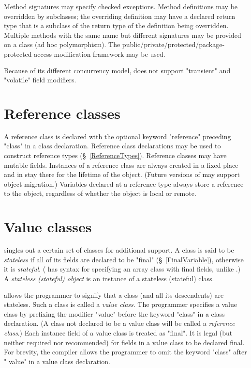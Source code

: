 Method signatures may specify checked exceptions. Method definitions
may be overridden by subclasses; the overriding definition may have a
declared return type that is a subclass of the return type of the
definition being overridden. Multiple methods with the same name but
different signatures may be provided on a class (ad hoc
polymorphism). The public/private/protected/package-protected access
modification framework may be used.


Because of its different concurrency model, \Xten{} does not support
\xcd"transient" and \xcd"volatile" field modifiers.


\section{Reference classes}\label{ReferenceClasses}
A reference class is declared with the optional keyword \xcd"reference" preceding \xcd"class" in a class declaration. Reference
class declarations may be used to construct reference types
(\S~\ref{ReferenceTypes}). Reference classes may have mutable
fields. Instances of a reference class are always created in a fixed
place and in \XtenCurrVer{} stay there for the lifetime of the
object. (Future versions of \Xten{} may support object migration.)
Variables declared at a reference type always store a reference to the
object, regardless of whether the object is local or remote.

\section{Value classes}\label{ValueClasses}

{}\Xten{} singles out a certain set of classes for additional
support. A class is said to be {\em stateless} if all of its fields
are declared to be \xcd"final" (\S~\ref{FinalVariable}), otherwise it
is {\em stateful}. (\Xten{} has syntax for specifying an array class
with final fields, unlike \java{}.) A {\em stateless (stateful)
object} is an instance of a stateless (stateful) class.

{}\Xten{} allows the programmer to signify that a class (and all its
descendents) are stateless. Such a class is called a {\em value
class}.  The programmer specifies a value class by prefixing the
modifier \xcd"value" before the keyword \xcd"class" in a class
declaration.  (A class not declared to be a value class will be called
a {\em reference class}.)  Each instance field of a value class is
treated as \xcd"final". It is legal (but neither required nor recommended)
for fields in a value class to be declared final. For brevity, the \Xten{}
compiler allows the programmer to omit the keyword \xcd"class" after
\xcd" value" in a value class declaration.


